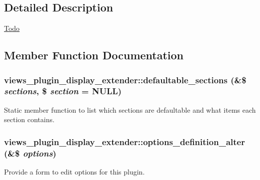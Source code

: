 \subsection{Detailed Description}
\begin{Desc}
\item[\hyperlink{todo__todo000056}{Todo}]\end{Desc}


\subsection{Member Function Documentation}
\hypertarget{classviews__plugin__display__extender_ae7dfa23cf88eee9abdbdf6e6ba622f61}{
\subsubsection[{defaultable\_\-sections}]{\setlength{\rightskip}{0pt plus 5cm}views\_\-plugin\_\-display\_\-extender::defaultable\_\-sections (\&\$ {\em sections}, \/  \$ {\em section} = {\ttfamily NULL})}}
\label{classviews__plugin__display__extender_ae7dfa23cf88eee9abdbdf6e6ba622f61}
Static member function to list which sections are defaultable and what items each section contains. \hypertarget{classviews__plugin__display__extender_a684077b715aa9ddce09d223544b7263c}{
\subsubsection[{options\_\-definition\_\-alter}]{\setlength{\rightskip}{0pt plus 5cm}views\_\-plugin\_\-display\_\-extender::options\_\-definition\_\-alter (\&\$ {\em options})}}
\label{classviews__plugin__display__extender_a684077b715aa9ddce09d223544b7263c}
Provide a form to edit options for this plugin. 

